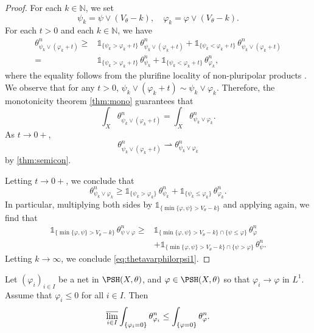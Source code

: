 \begin{proof}
    For each $k\in \mathbb{N}$, we set
    \[
    \psi_k=\psi\lor (V_{\theta}-k),\quad \varphi_k=\varphi\lor (V_{\theta}-k).
    \]
    For each $t>0$ and each $k\in \mathbb{N}$, we have
    \[
    \begin{split}
    \theta_{\psi_k\lor (\varphi_k+t)}^n\geq & \mathds{1}_{\{\psi_k>\varphi_k+t\}}\,\theta_{\psi_k\lor (\varphi_k+t)}^n+\mathds{1}_{\{\psi_k<\varphi_k+t\}}\,\theta_{\psi_k\lor (\varphi _k+t)}^n\\
    =&\mathds{1}_{\{\psi_k>\varphi_k+t\}}\,\theta_{\psi_k}^n+\mathds{1}_{\{\psi_k<\varphi_k+t\}}\,\theta_{\varphi_k}^n,
    \end{split}
    \]
    where the equality follows from the plurifine locality of non-pluripolar products . We observe that for any $t>0$, $\psi_k\lor (\varphi_k+t)\sim \psi_k\lor \varphi_k$. Therefore, the monotonicity theorem \cref{thm:mono} guarantees that
    \[
        \int_X \theta_{\psi_k\lor (\varphi_k+t)}^n=\int_X\theta_{\psi_k\lor \varphi_k}^n.
    \]
    As $t\to 0+$,
    \[
    \theta_{\psi_k\lor (\varphi_k+t)}^n\rightharpoonup \theta_{\psi_k\lor \varphi_k}^n
    \]
    by \cref{thm:semicon}.

    Letting $t\to 0+$, we conclude that
    \[
    \theta_{\psi_k\lor \varphi_k}^n\geq \mathds{1}_{\{\psi_k>\varphi_k\}}\,\theta_{\psi_k}^n+\mathds{1}_{\{\psi_k\leq \varphi_k\}}\,\theta_{\varphi_k}^n.
    \]
    In particular, multiplying both sides by $\mathds{1}_{\{\min\{\varphi,\psi\}>V_{\theta}-k\}}$ and applying  again, we find that
    \[
    \begin{split}
    \mathds{1}_{\{\min\{\varphi,\psi\}>V_{\theta}-k\}}\,\theta_{\psi\lor \varphi}^n\geq &\mathds{1}_{\{\min\{\varphi,\psi\}>V_{\theta}-k\}\cap \{\psi\leq \varphi\}}\,\theta_{\varphi}^n \\
    &+\mathds{1}_{\{\min\{\varphi,\psi\}>V_{\theta}-k\}\cap \{\psi>\varphi\}}\,\theta_{\psi}^n.
    \end{split}
    \]
    Letting $k\to\infty$, we conclude \eqref{eq:thetavarphilorpsi1}.
\end{proof}
\begin{corollary}\label{cor:intcontlimsup}
    Let $(\varphi_i)_{i\in I}$ be a net in $\PSH(X,\theta)$, and $\varphi\in \PSH(X,\theta)$ so that $\varphi_i\to \varphi$ in $L^1$. Assume that $\varphi_i\leq 0$ for all $i\in I$.
    Then
    \begin{equation}\label{eq:contact_int_usc}
    \varlimsup_{i\in I} \int_{\{\varphi_i=0\}}\theta_{\varphi_i}^n\leq \int_{\{\varphi=0\}} \theta_{\varphi}^n.
    \end{equation}
\end{corollary}
